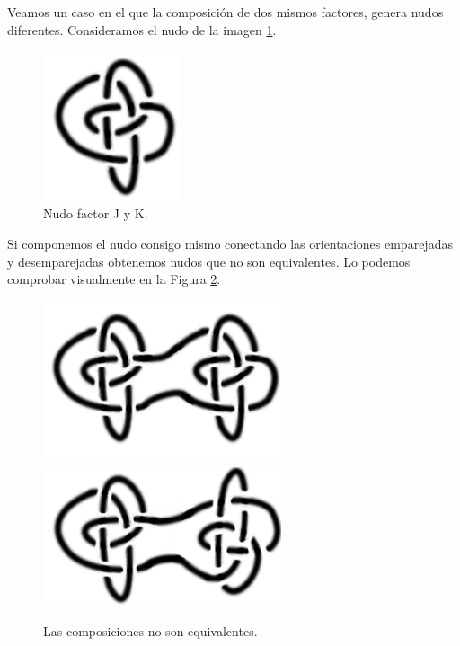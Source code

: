 Veamos un caso en el que la composición de dos mismos factores, genera nudos diferentes. Consideramos el nudo de la imagen \ref{comp7}.\\

\begin{figure}[h!]
	\includegraphics[width=4cm]{inudos/817con.png}
	\centering
	\caption{Nudo factor J y K.}
	\label{comp7} 
\end{figure}
Si componemos el nudo consigo mismo conectando las orientaciones emparejadas y desemparejadas obtenemos nudos que no son equivalentes. Lo podemos comprobar visualmente en la Figura \ref{comp8}.

\begin{figure}[h!]
	\includegraphics[width=7cm]{inudos/817def1.png}
	\includegraphics[width=7cm]{inudos/817def2.png}
	\centering
	\caption{Las composiciones no son equivalentes.}
	\label{comp8} 
\end{figure}